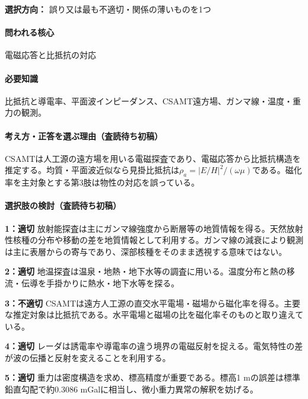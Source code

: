\noindent\textbf{選択方向：} 誤り又は最も不適切・関係の薄いものを1つ\par

\paragraph{問われる核心} 電磁応答と比抵抗の対応

\paragraph{必要知識} 比抵抗と導電率、平面波インピーダンス、CSAMT遠方場、ガンマ線・温度・重力の観測。

\paragraph{考え方・正答を選ぶ理由（査読待ち初稿）} CSAMTは人工源の遠方場を用いる電磁探査であり、電磁応答から比抵抗構造を推定する。均質・平面波近似なら見掛比抵抗は\(\rho_a=|E/H|^2/(\omega\mu)\)である。磁化率を主対象とする第3肢は物性の対応を誤っている。

\paragraph{選択肢の検討（査読待ち初稿）}\mbox{}\par

\noindent\textbf{1：適切} 放射能探査は主にガンマ線強度から断層等の地質情報を得る。天然放射性核種の分布や移動の差を地質情報として利用する。ガンマ線の減衰により観測は主に表層からの寄与であり、深部核種をそのまま透視する意味ではない。\par

\noindent\textbf{2：適切} 地温探査は温泉・地熱・地下水等の調査に用いる。温度分布と熱の移流・伝導を手掛かりに熱水・地下水等を探る。\par

\noindent\textbf{3：不適切} CSAMTは遠方人工源の直交水平電場・磁場から磁化率を得る。主要な推定対象は比抵抗である。水平電場と磁場の比を磁化率そのものと取り違えている。\par

\noindent\textbf{4：適切} レーダは誘電率や導電率の違う境界の電磁反射を捉える。電気特性の差が波の伝播と反射を変えることを利用する。\par

\noindent\textbf{5：適切} 重力は密度構造を求め、標高精度が重要である。標高1 mの誤差は標準鉛直勾配で約0.3086 mGalに相当し、微小重力異常の解釈を妨げる。\par

